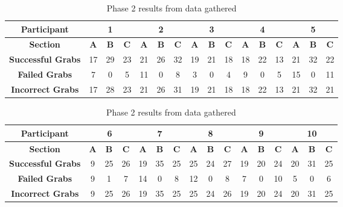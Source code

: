 \documentclass[12pt]{article}
\begin{document}
\begin{table}[!ht]
\centering
\begin{tabular}{ |c|c|c|c|c|c|c|c|c|c|c|c|c|c|c|c| }
 	\hline
	\textbf{Participant} & \multicolumn{3}{|c|}{\textbf{1}} &  \multicolumn{3}{|c|}{\textbf{2}} & \multicolumn{3}{|c|}{\textbf{3}} & \multicolumn{3}{|c|}{\textbf{4}} & \multicolumn{3}{|c|}{\textbf{5}} \\
	\hline
	\textbf{Section} & \textbf{A} & \textbf{B} & \textbf{C} & \textbf{A} & \textbf{B} & \textbf{C} & \textbf{A} & \textbf{B} & \textbf{C} & \textbf{A} & \textbf{B} & \textbf{C} & \textbf{A} & \textbf{B} & \textbf{C} \\
	\hline
	\textbf{Successful Grabs} & 17 & 29 & 23 & 21 & 26 & 32 & 19 & 21 & 18 & 18 & 22 & 13 & 21 & 32 & 22 \\
	\hline
	\textbf{Failed Grabs} & 7 & 0 & 5 & 11 & 0 & 8 & 3 & 0 & 4 & 9 & 0 & 5 & 15 & 0 & 11 \\
	\hline
	\textbf{Incorrect Grabs} & 17 & 28 & 23 & 21 & 26 & 31 & 19 & 21 & 18 & 18 & 22 & 13 & 21 & 32 & 21 \\
	\hline
\end{tabular}

\centering
\vspace{1cm}\begin{tabular}{ |c|c|c|c|c|c|c|c|c|c|c|c|c|c|c|c| }
 	\hline
	\textbf{Participant} & \multicolumn{3}{|c|}{\textbf{6}} & \multicolumn{3}{|c|}{\textbf{7}} & \multicolumn{3}{|c|}{\textbf{8}} & \multicolumn{3}{|c|}{\textbf{9}} & \multicolumn{3}{|c|}{\textbf{10}} \\
	\hline
	\textbf{Section} & \textbf{A} & \textbf{B} & \textbf{C} & \textbf{A} & \textbf{B} & \textbf{C} & \textbf{A} & \textbf{B} & \textbf{C} & \textbf{A} & \textbf{B} & \textbf{C} & \textbf{A} & \textbf{B} & \textbf{C} \\
	\hline
	\textbf{Successful Grabs} & 9 & 25 & 26 & 19 & 35 & 25 & 25 & 24 & 27 & 19 & 20 & 24 & 20 & 31 & 25 \\
	\hline
	\textbf{Failed Grabs} & 9 & 1 & 7 & 14 & 0 & 8 & 12 & 0 & 8 & 7 & 0 & 10 & 5 & 0 & 6 \\
	\hline
	\textbf{Incorrect Grabs} & 9 & 25 & 26 & 19 & 35 & 25 & 25 & 24 & 26 & 19 & 20 & 24 & 20 & 31 & 25 \\
	\hline
\end{tabular}

\caption{Phase 2 results from data gathered}
\end{table}

\pagebreak
\end{document}
